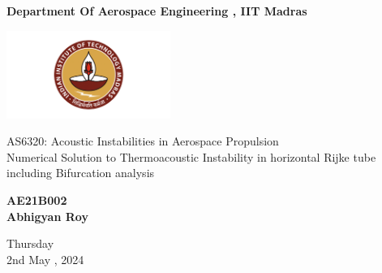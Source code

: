 \documentclass[8pt]{article} %
\begin{document}
\begin{titlepage}
    \begin{center}
        
        \vspace*{1cm}
            
        \Huge
        \textbf{Department Of Aerospace Engineering , IIT Madras}
	
        \vspace{0.5cm}

	\includegraphics[width=0.4\textwidth]{IITM_logo.png}

        \LARGE
        AS6320: Acoustic Instabilities in Aerospace Propulsion \\
	\vspace{2cm}
	Numerical Solution to Thermoacoustic Instability in horizontal Rijke tube including Bifurcation analysis
            
        \vspace{1.5cm}
            
        \textbf{AE21B002\\Abhigyan Roy\\}
            
        \vfill
           
        \vspace{0.8cm}
            
        \Large
        Thursday\\
        2nd May , 2024\\
            
    \end{center}
\end{titlepage}

\newpage
\tableofcontents
\vspace{2cm}
\listoffigures


\newpage
\end{document}
